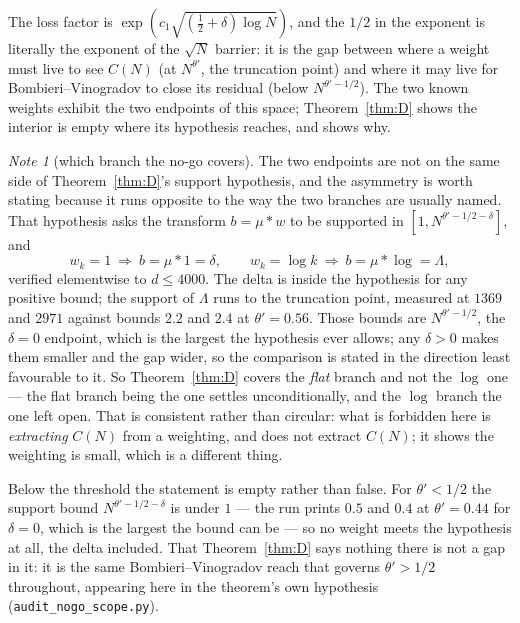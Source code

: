 \documentclass[11pt,a4paper]{article}
\theoremstyle{plain}
\theoremstyle{definition}
\theoremstyle{remark}
\newtheorem{note}[theorem]{Note}
\begin{document}
The loss factor is $\exp(c_1\sqrt{(\frac12+\delta)\log N})$, and the $1/2$ in the
exponent is literally the exponent of the $\sqrt N$ barrier: it is the
gap between where a weight must live to see $C(N)$ (at $N^{\theta'}$,
the truncation point) and where it may live for
Bombieri--Vinogradov to close its residual (below $N^{\theta'-1/2}$).
The two known weights exhibit the two endpoints of this space;
Theorem~\ref{thm:D} shows the interior is empty where its
hypothesis reaches, and shows why.

\begin{note}[which branch the no-go covers]\label{note:nogoscope}
The two endpoints are not on the same side of Theorem~\ref{thm:D}'s
support hypothesis, and the asymmetry is worth stating because it runs
opposite to the way the two branches are usually named. That hypothesis
asks the transform $b=\mu*w$ to be supported in
$[1,N^{\theta'-1/2-\delta}]$, and
\[
  w_k=1\ \Longrightarrow\ b=\mu*1=\delta,
  \qquad
  w_k=\log k\ \Longrightarrow\ b=\mu*\log=\Lambda ,
\]
verified elementwise to $d\le4000$. The delta is inside the hypothesis
for any positive bound; the support of $\Lambda$ runs to the truncation
point, measured at $1369$ and $2971$ against bounds $2.2$ and $2.4$ at
$\theta'=0.56$. Those bounds are $N^{\theta'-1/2}$, the $\delta=0$
endpoint, which is the largest the hypothesis ever allows; any
$\delta>0$ makes them smaller and the gap wider, so the comparison is
stated in the direction least favourable to it.
So Theorem~\ref{thm:D} covers the \emph{flat} branch
and not the $\log$ one --- the flat branch being the one
\cite[Theorem on the flat branch]{P1} settles unconditionally, and the $\log$ branch the
one left open. That is consistent rather than circular: what is
forbidden here is \emph{extracting} $C(N)$ from a weighting, and
\cite[Theorem on the flat branch]{P1} does not extract $C(N)$; it shows the weighting is
small, which is a different thing.

Below the threshold the statement is empty rather than false. For
$\theta'<1/2$ the support bound $N^{\theta'-1/2-\delta}$ is under $1$
--- the run prints $0.5$ and $0.4$ at $\theta'=0.44$ for $\delta=0$,
which is the largest the bound can be --- so no weight meets
the hypothesis at all, the delta included. That Theorem~\ref{thm:D}
says nothing there is not a gap in it: it is the same
Bombieri--Vinogradov reach that governs $\theta'>1/2$ throughout,
appearing here in the theorem's own hypothesis
(\texttt{audit\_nogo\_scope.py}).
\end{note}
\end{document}
